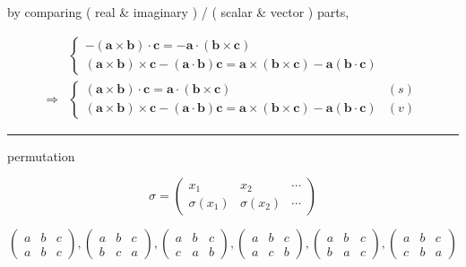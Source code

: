 \documentclass[
]{book}
\theoremstyle{definition}
\theoremstyle{definition}
\theoremstyle{definition}
\theoremstyle{definition}
\theoremstyle{remark}
\begin{document}
by comparing ( real \& imaginary ) / ( scalar \& vector ) parts,

\[
\begin{aligned}
 & \begin{cases}
-\left(\boldsymbol{a}\times\boldsymbol{b}\right)\cdot\boldsymbol{c}=-\boldsymbol{a}\cdot\left(\boldsymbol{b}\times\boldsymbol{c}\right)\\
\left(\boldsymbol{a}\times\boldsymbol{b}\right)\times\boldsymbol{c}-\left(\boldsymbol{a}\cdot\boldsymbol{b}\right)\boldsymbol{c}=\boldsymbol{a}\times\left(\boldsymbol{b}\times\boldsymbol{c}\right)-\boldsymbol{a}\left(\boldsymbol{b}\cdot\boldsymbol{c}\right)
\end{cases}\\
\Rightarrow & \begin{cases}
\left(\boldsymbol{a}\times\boldsymbol{b}\right)\cdot\boldsymbol{c}=\boldsymbol{a}\cdot\left(\boldsymbol{b}\times\boldsymbol{c}\right) & \left(s\right)\\
\left(\boldsymbol{a}\times\boldsymbol{b}\right)\times\boldsymbol{c}-\left(\boldsymbol{a}\cdot\boldsymbol{b}\right)\boldsymbol{c}=\boldsymbol{a}\times\left(\boldsymbol{b}\times\boldsymbol{c}\right)-\boldsymbol{a}\left(\boldsymbol{b}\cdot\boldsymbol{c}\right) & \left(v\right)
\end{cases}
\end{aligned}
\]

\begin{center}\rule{0.5\linewidth}{0.5pt}\end{center}

permutation

\[
\sigma=\begin{pmatrix}x_{{\scriptscriptstyle 1}} & x_{{\scriptscriptstyle 2}} & \cdots\\
\sigma\left(x_{{\scriptscriptstyle 1}}\right) & \sigma\left(x_{{\scriptscriptstyle 2}}\right) & \cdots
\end{pmatrix}
\]

\[
\begin{pmatrix}a & b & c\\
a & b & c
\end{pmatrix},\begin{pmatrix}a & b & c\\
b & c & a
\end{pmatrix},\begin{pmatrix}a & b & c\\
c & a & b
\end{pmatrix},\begin{pmatrix}a & b & c\\
a & c & b
\end{pmatrix},\begin{pmatrix}a & b & c\\
b & a & c
\end{pmatrix},\begin{pmatrix}a & b & c\\
c & b & a
\end{pmatrix}
\]
\end{document}
